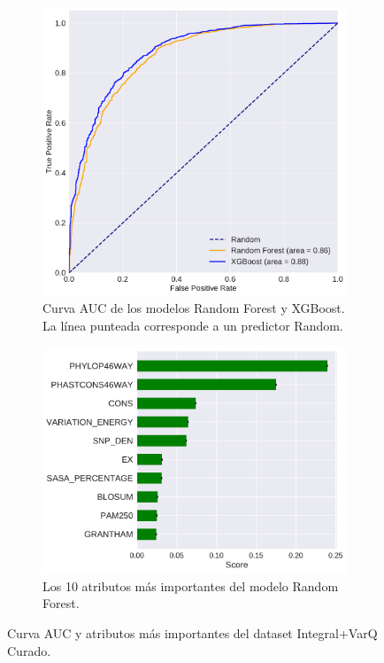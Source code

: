 \newpage
\begin{figure}[H]
\centering
\begin{subfigure}[b]{0.7\textwidth}
    \centering
    \includegraphics[width=\textwidth]{documents/latex/figures/3/integral_varq/auc_varq_integral.pdf}
    \caption{Curva AUC de los modelos Random Forest y XGBoost. La línea punteada corresponde a un predictor Random.}
    \label{fig:auc_integral_varq}
\end{subfigure}
\hfill
\hfill
\begin{subfigure}[b]{0.7\textwidth}
    \centering
    \includegraphics[width=\textwidth]{documents/latex/figures/3/integral_varq/importances_varq_integral.pdf}
    \caption{Los 10 atributos más importantes del modelo Random Forest.}
    \label{fig:importances_integral_varq}
\end{subfigure}

\caption{Curva AUC y atributos más importantes del dataset Integral+VarQ Curado.}
\end{figure}
